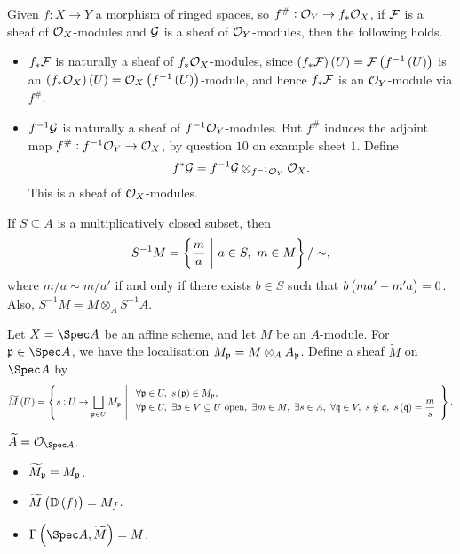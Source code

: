 \begin{definition*}
\begin{itemize}
Given $ f : X \to Y $ a morphism of ringed spaces, so $ f^\# : \mathcal{O}_Y \to f_*\mathcal{O}_X $, if $ \mathcal{F} $ is a sheaf of $ \mathcal{O}_X $-modules and $ \mathcal{G} $ is a sheaf of $ \mathcal{O}_Y $-modules, then the following holds.
\begin{itemize}
\item $ f_*\mathcal{F} $ is naturally a sheaf of $ f_*\mathcal{O}_X $-modules, since $ \br{f_*\FFF}\br{U} = \FFF\br{f^{-1}\br{U}} $ is an $ \br{f_*\OOO_X}\br{U} = \OOO_X\br{f^{-1}\br{U}} $-module, and hence $ f_*\mathcal{F} $ is an $ \mathcal{O}_Y $-module via $ f^\# $.
\item $ f^{-1}\mathcal{G} $ is naturally a sheaf of $ f^{-1}\mathcal{O}_Y $-modules. But $ f^\# $ induces the adjoint map $ f^\# : f^{-1}\mathcal{O}_Y \to \mathcal{O}_X $, by question $ 10 $ on example sheet $ 1 $. Define
$$ f^*\mathcal{G} = f^{-1}\mathcal{G} \otimes_{f^{-1}\mathcal{O}_Y} \mathcal{O}_X. $$
This is a sheaf of $ \mathcal{O}_X $-modules.
\end{itemize}
\end{itemize}
\end{definition*}

If $ S \subseteq A $ is a multiplicatively closed subset, then
$$ S^{-1}M = \cbr{\dfrac{m}{a} \st a \in S, \ m \in M} / \sim, $$
where $ m / a \sim m / a' $ if and only if there exists $ b \in S $ such that $ b\br{ma' - m'a} = 0 $. Also, $ S^{-1}M = M \otimes_A S^{-1}A $.

\begin{example*}
Let $ X = \Spec A $ be an affine scheme, and let $ M $ be an $ A $-module. For $ \ppp \in \Spec A $, we have the localisation $ M_{\mathfrak{p}} = M \otimes_A A_{\mathfrak{p}} $. Define a sheaf $ \widetilde{M} $ on $ \Spec A $ by
$$ \widetilde{M}\br{U} = \cbr{s : U \to \bigsqcup_{\ppp \in U} M_\ppp \st \begin{array}{l} \forall \ppp \in U, \ s\br{\ppp} \in M_\ppp, \\ \forall \ppp \in U, \ \exists \ppp \in V \subseteq U \ \text{open}, \ \exists m \in M, \ \exists s \in A, \ \forall \qqq \in V, \ s \notin \qqq, \ s\br{\qqq} = \dfrac{m}{s} \end{array}}. $$
\end{example*}

\begin{example*}
$ \widetilde{A} = \OOO_{\Spec A} $.
\end{example*}

\pagebreak

\begin{proposition}
\hfill
\begin{itemize}
\item $ \widetilde{M}_{\mathfrak{p}} = M_{\mathfrak{p}} $.
\item $ \widetilde{M}\br{\DD\br{f}} = M_f $.
\item $ \Gamma\br{\Spec A, \widetilde{M}} = M $.
\end{itemize}
\end{proposition}

